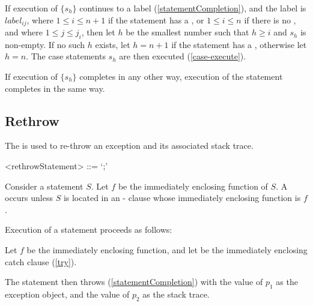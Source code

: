 \documentclass[makeidx]{article}
\begin{document}
{If execution of $\{s_h\}$ continues to a label
(\ref{statementCompletion}),
and the label is $label_{ij}$,
where $1 \le i \le n+1$ if the \SWITCH{} statement has a \DEFAULT,
or $1 \le i \le n$ if there is no \DEFAULT,
and where $1 \le j \le j_{i}$,
then let $h$ be the smallest number such that $h \ge i$ and $s_h$ is non-empty.
If no such $h$ exists,
let $h = n + 1$ if the \SWITCH{} statement has a \DEFAULT,
otherwise let $h = n$.
The case statements $s_h$ are then executed (\ref{case-execute}).

If execution of $\{s_h\}$ completes in any other way,
execution of the \SWITCH{} statement completes in the same way.


\subsection{Rethrow}

\LMHash{}%
The  is used to
re-throw an exception and its associated stack trace.

\begin{grammar}
<rethrowStatement> ::= \RETHROW{} `;'
\end{grammar}

\LMHash{}%
Consider a \RETHROW{} statement $S$.
Let $f$ be the immediately enclosing function of $S$.
A  occurs unless $S$ is located in
an \ON-\CATCH{} clause whose immediately enclosing function is $f$.

\LMHash{}%
Execution of a \code{\RETHROW} statement proceeds as follows:

\LMHash{}%
Let $f$ be the immediately enclosing function,
and let 
be the immediately enclosing catch clause (\ref{try}).


\LMHash{}%
The \RETHROW{} statement then throws (\ref{statementCompletion})
with the value of $p_1$ as the exception object,
and the value of $p_2$ as the stack trace.


}
\end{document}
